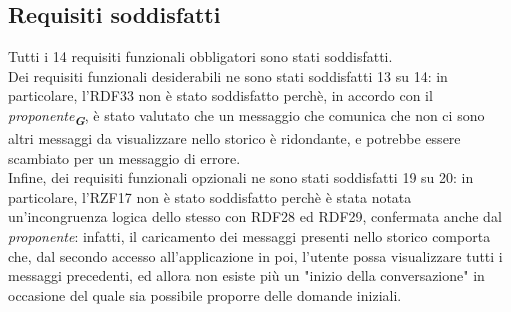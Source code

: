 \subsection{Requisiti soddisfatti}
\label{sec:requisiti_soddisfatti}

Tutti i 14 requisiti funzionali obbligatori sono stati soddisfatti.\\
Dei requisiti funzionali desiderabili ne sono stati soddisfatti 13 su 14: in particolare, l'RDF33 non è stato soddisfatto perchè, in accordo con il \emph{proponente}\textsubscript{\textbf{\textit{G}}}, è stato valutato che un messaggio che comunica che non ci sono altri messaggi da visualizzare nello storico è ridondante, e potrebbe essere scambiato per un messaggio di errore.\\
Infine, dei requisiti funzionali opzionali ne sono stati soddisfatti 19 su 20: in particolare, l'RZF17 non è stato soddisfatto perchè è stata notata un'incongruenza logica dello stesso con RDF28 ed RDF29, confermata anche dal \emph{proponente}: infatti, il caricamento dei messaggi presenti nello storico comporta che, dal secondo accesso all'applicazione in poi, l'utente possa visualizzare tutti i messaggi precedenti, ed allora non esiste più un "inizio della conversazione" in occasione del quale sia possibile proporre delle domande iniziali.

